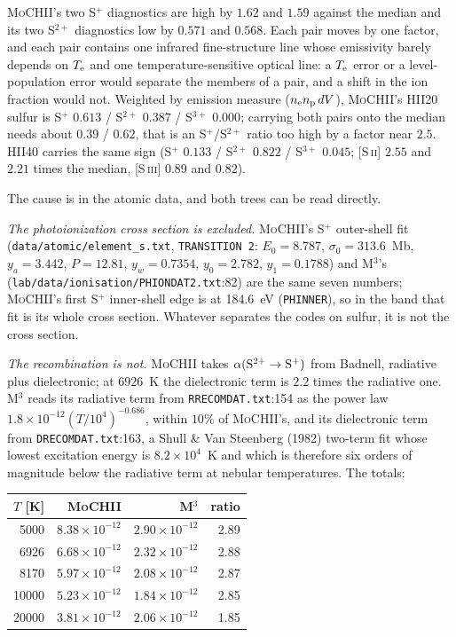 \documentclass[english,a4paper]{my_memo}
\newcommand{\code}[1]{\texttt{#1}}
\newcommand{\MoCHII}{\textsc{MoCHII}}
\newcommand{\Mthree}{M$^3$}
\newcommand{\Te}{T_{\rm e}}
\begin{document}
\MoCHII{}'s two S$^+$ diagnostics are high by $1.62$ and $1.59$ against the
median and its two S$^{2+}$ diagnostics low by $0.571$ and $0.568$.  Each
pair moves by one factor, and each pair contains one infrared
fine-structure line whose emissivity barely depends on $\Te$ and one
temperature-sensitive optical line: a $\Te$ error or a level-population
error would separate the members of a pair, and a shift in the ion fraction
would not.  Weighted by emission measure ($n_{\rm e}n_{\rm p}\,dV$),
\MoCHII{}'s HII20 sulfur is S$^+$ $0.613$ / S$^{2+}$ $0.387$ / S$^{3+}$
$0.000$; carrying both pairs onto the median needs about $0.39$ / $0.62$,
that is an S$^+$/S$^{2+}$ ratio too high by a factor near $2.5$.  HII40
carries the same sign (S$^+$ $0.133$ / S$^{2+}$ $0.822$ / S$^{3+}$ $0.045$;
[S\,\textsc{ii}] $2.55$ and $2.21$ times the median, [S\,\textsc{iii}]
$0.89$ and $0.82$).

The cause is in the atomic data, and both trees can be read directly.

\emph{The photoionization cross section is excluded.}  \MoCHII{}'s
S$^+$ outer-shell fit (\code{data/atomic/element\_s.txt},
\code{TRANSITION 2}: $E_0 = 8.787$, $\sigma_0 = 313.6$~Mb, $y_a = 3.442$,
$P = 12.81$, $y_w = 0.7354$, $y_0 = 2.782$, $y_1 = 0.1788$) and
\Mthree{}'s (\code{lab/data/ionisation/PHIONDAT2.txt}:82) are the same
seven numbers; \MoCHII{}'s first S$^+$ inner-shell edge is at 184.6~eV
(\code{PHINNER}), so in the band that fit is its whole cross section.  Whatever separates the codes on sulfur, it is not the
cross section.

\emph{The recombination is not.}  \MoCHII{} takes
$\alpha({\rm S^{2+}}\rightarrow{\rm S^+})$ from Badnell, radiative plus
dielectronic; at $6926$~K the dielectronic term is $2.2$ times the
radiative one.  \Mthree{} reads its radiative term from
\code{RRECOMDAT.txt}:154 as the power law
$1.8{\times}10^{-12}(T/10^4)^{-0.686}$, within $10\%$ of \MoCHII{}'s, and
its dielectronic term from \code{DRECOMDAT.txt}:163, a Shull \& Van
Steenberg (1982) two-term fit whose lowest excitation energy is
$8.2{\times}10^{4}$~K \cite{shull1982} and which is therefore six orders of
magnitude below the radiative term at nebular temperatures.  The totals:

\begin{center}\small
\begin{tabular}{rrrr}
\toprule
$T$ [K] & \MoCHII{} & \Mthree{} & ratio \\
\midrule
 5000 & $8.38{\times}10^{-12}$ & $2.90{\times}10^{-12}$ & 2.89 \\
 6926 & $6.68{\times}10^{-12}$ & $2.32{\times}10^{-12}$ & 2.88 \\
 8170 & $5.97{\times}10^{-12}$ & $2.08{\times}10^{-12}$ & 2.87 \\
10000 & $5.23{\times}10^{-12}$ & $1.84{\times}10^{-12}$ & 2.85 \\
20000 & $3.81{\times}10^{-12}$ & $2.06{\times}10^{-12}$ & 1.85 \\
\bottomrule
\end{tabular}
\end{center}
\end{document}
